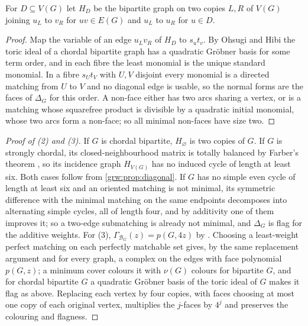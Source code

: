 For $D\subseteq V(G)$ let $H_D$ be the bipartite graph on two copies $L,R$
of $V(G)$ joining $u_L$ to $v_R$ for $uv\in E(G)$ and $u_L$ to $u_R$ for
$u\in D$.


\begin{proof}
Map the variable of an edge $u_Lv_R$ of $H_D$ to $s_ut_v$. By Ohsugi and Hibi
\cite{OhsugiHibi1999Koszul} the toric ideal of a chordal bipartite graph has
a quadratic Gr\"obner basis for some term order, and in each fibre the least
monomial is the unique standard monomial. In a fibre $s_Ut_V$ with $U,V$
disjoint every monomial is a directed matching from $U$ to $V$ and no
diagonal edge is usable, so the normal forms are the faces of $\Delta_G$ for
this order. A non-face either has two arcs sharing a vertex, or is a
matching whose squarefree product is divisible by a quadratic initial
monomial, whose two arcs form a non-face; so all minimal non-faces have size
two.
\end{proof}

\begin{proof}[Proof of \textup{(2)} and \textup{(3)}]
If $G$ is chordal bipartite, $H_\varnothing$ is two copies of $G$. If $G$ is
strongly chordal, its closed-neighbourhood matrix is totally balanced by
Farber's theorem \cite{Farber1983Characterizations}, so its incidence graph
$H_{V(G)}$ has no induced cycle of length at least six. Both cases follow
from \cref{grw:prop:diagonal}. If $G$ has no simple even cycle of length at
least six and an oriented matching is not minimal, its symmetric difference
with the minimal matching on the same endpoints decomposes into alternating
simple cycles, all of length four, and by additivity one of them improves it;
so a two-edge submatching is already not minimal, and $\Delta_G$ is flag for
the additive weights. For (3), $\Gamma_{\mathcal B_G}(z)=p(G,4z)$ by
\cite[Proposition~4.1 and Theorem~7.1]{OhsugiTsuchiya2021Symmetric}.
Choosing a least-weight perfect matching on each perfectly matchable set
gives, by the same replacement argument and for every graph, a complex on the
edges with face polynomial $p(G,z)$; a minimum cover colours it with
$\nu(G)$ colours for bipartite $G$, and for chordal bipartite $G$ a quadratic
Gr\"obner basis of the toric ideal of $G$ makes it flag as above. Replacing
each vertex by four copies, with faces choosing at most one copy of each
original vertex, multiplies the $j$-faces by $4^j$ and preserves the colouring
and flagness.
\end{proof}

